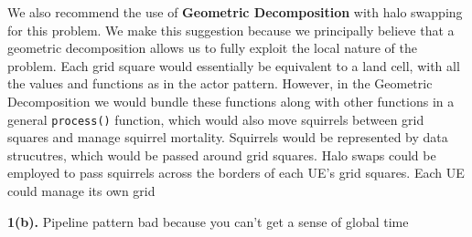 \documentclass{article}
\begin{document}
We also recommend the use of \textbf{Geometric Decomposition} with halo swapping for this problem. We make this suggestion because we principally believe that a geometric decomposition allows us to fully exploit the local nature of the problem. Each grid square would essentially be equivalent to a land cell, with all the values and functions as in the actor pattern. However, in the Geometric Decomposition we would bundle these functions along with other functions in a general \texttt{process()} function, which would also move squirrels between grid squares and manage squirrel mortality. Squirrels would be represented by data strucutres, which would be passed around grid squares. Halo swaps could be employed to pass squirrels across the borders of each UE's grid squares. Each UE could manage its own grid \newline

\noindent\textbf{1(b).} \newline
Pipeline pattern bad because you can't get a sense of global time
\end{document}
